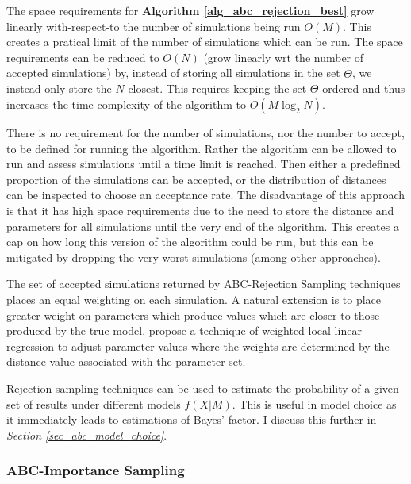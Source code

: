 \documentclass[11pt,a4paper]{article}
\theoremstyle{break}
\begin{document}
  \par The space requirements for \textbf{Algorithm \ref{alg_abc_rejection_best}} grow linearly with-respect-to the number of simulations being run $O(M)$. This creates a pratical limit of the number of simulations which can be run. The space requirements can be reduced to $O(N)$ (grow linearly wrt the number of accepted simulations) by, instead of storing all simulations in the set $\tilde\Theta$, we instead only store the $N$ closest. This requires keeping the set $\tilde\Theta$ ordered and thus increases the time complexity of the algorithm to $O(M\log_2 N)$.

  \par There is no requirement for the number of simulations, nor the number to accept, to be defined for running the algorithm. Rather the algorithm can be allowed to run and assess simulations until a time limit is reached. Then either a predefined proportion of the simulations can be accepted, or the distribution of distances can be inspected to choose an acceptance rate. The disadvantage of this approach is that it has high space requirements due to the need to store the distance and parameters for all simulations until the very end of the algorithm. This creates a cap on how long this version of the algorithm could be run, but this can be mitigated by dropping the very worst simulations (among other approaches).

  \par The set of accepted simulations returned by ABC-Rejection Sampling techniques places an equal weighting on each simulation. A natural extension is to place greater weight on parameters which produce values which are closer to those produced by the true model. \cite[]{ABC_in_population_genetics} propose a technique of weighted local-linear regression to adjust parameter values where the weights are determined by the distance value associated with the parameter set.

  \par Rejection sampling techniques can be used to estimate the probability of a given set of results under different models $f(X|M)$. This is useful in model choice as it immediately leads to estimations of Bayes' factor. I discuss this further in \textit{Section \ref{sec_abc_model_choice}}.

\subsubsection{ABC-Importance Sampling}\label{sec_abc_importance_sampling}
\end{document}
